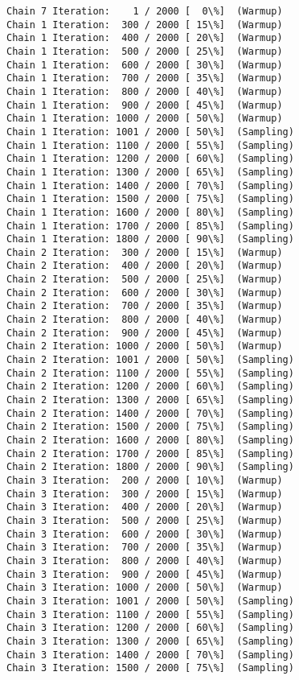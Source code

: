 \documentclass[11pt]{article}
\begin{document}
    \begin{Verbatim}[commandchars=\\\{\}]
Chain 7 Iteration:    1 / 2000 [  0\%]  (Warmup)
Chain 1 Iteration:  300 / 2000 [ 15\%]  (Warmup)
Chain 1 Iteration:  400 / 2000 [ 20\%]  (Warmup)
Chain 1 Iteration:  500 / 2000 [ 25\%]  (Warmup)
Chain 1 Iteration:  600 / 2000 [ 30\%]  (Warmup)
Chain 1 Iteration:  700 / 2000 [ 35\%]  (Warmup)
Chain 1 Iteration:  800 / 2000 [ 40\%]  (Warmup)
Chain 1 Iteration:  900 / 2000 [ 45\%]  (Warmup)
Chain 1 Iteration: 1000 / 2000 [ 50\%]  (Warmup)
Chain 1 Iteration: 1001 / 2000 [ 50\%]  (Sampling)
Chain 1 Iteration: 1100 / 2000 [ 55\%]  (Sampling)
Chain 1 Iteration: 1200 / 2000 [ 60\%]  (Sampling)
Chain 1 Iteration: 1300 / 2000 [ 65\%]  (Sampling)
Chain 1 Iteration: 1400 / 2000 [ 70\%]  (Sampling)
Chain 1 Iteration: 1500 / 2000 [ 75\%]  (Sampling)
Chain 1 Iteration: 1600 / 2000 [ 80\%]  (Sampling)
Chain 1 Iteration: 1700 / 2000 [ 85\%]  (Sampling)
Chain 1 Iteration: 1800 / 2000 [ 90\%]  (Sampling)
Chain 2 Iteration:  300 / 2000 [ 15\%]  (Warmup)
Chain 2 Iteration:  400 / 2000 [ 20\%]  (Warmup)
Chain 2 Iteration:  500 / 2000 [ 25\%]  (Warmup)
Chain 2 Iteration:  600 / 2000 [ 30\%]  (Warmup)
Chain 2 Iteration:  700 / 2000 [ 35\%]  (Warmup)
Chain 2 Iteration:  800 / 2000 [ 40\%]  (Warmup)
Chain 2 Iteration:  900 / 2000 [ 45\%]  (Warmup)
Chain 2 Iteration: 1000 / 2000 [ 50\%]  (Warmup)
Chain 2 Iteration: 1001 / 2000 [ 50\%]  (Sampling)
Chain 2 Iteration: 1100 / 2000 [ 55\%]  (Sampling)
Chain 2 Iteration: 1200 / 2000 [ 60\%]  (Sampling)
Chain 2 Iteration: 1300 / 2000 [ 65\%]  (Sampling)
Chain 2 Iteration: 1400 / 2000 [ 70\%]  (Sampling)
Chain 2 Iteration: 1500 / 2000 [ 75\%]  (Sampling)
Chain 2 Iteration: 1600 / 2000 [ 80\%]  (Sampling)
Chain 2 Iteration: 1700 / 2000 [ 85\%]  (Sampling)
Chain 2 Iteration: 1800 / 2000 [ 90\%]  (Sampling)
Chain 3 Iteration:  200 / 2000 [ 10\%]  (Warmup)
Chain 3 Iteration:  300 / 2000 [ 15\%]  (Warmup)
Chain 3 Iteration:  400 / 2000 [ 20\%]  (Warmup)
Chain 3 Iteration:  500 / 2000 [ 25\%]  (Warmup)
Chain 3 Iteration:  600 / 2000 [ 30\%]  (Warmup)
Chain 3 Iteration:  700 / 2000 [ 35\%]  (Warmup)
Chain 3 Iteration:  800 / 2000 [ 40\%]  (Warmup)
Chain 3 Iteration:  900 / 2000 [ 45\%]  (Warmup)
Chain 3 Iteration: 1000 / 2000 [ 50\%]  (Warmup)
Chain 3 Iteration: 1001 / 2000 [ 50\%]  (Sampling)
Chain 3 Iteration: 1100 / 2000 [ 55\%]  (Sampling)
Chain 3 Iteration: 1200 / 2000 [ 60\%]  (Sampling)
Chain 3 Iteration: 1300 / 2000 [ 65\%]  (Sampling)
Chain 3 Iteration: 1400 / 2000 [ 70\%]  (Sampling)
Chain 3 Iteration: 1500 / 2000 [ 75\%]  (Sampling)

\end{Verbatim}
\end{document}
